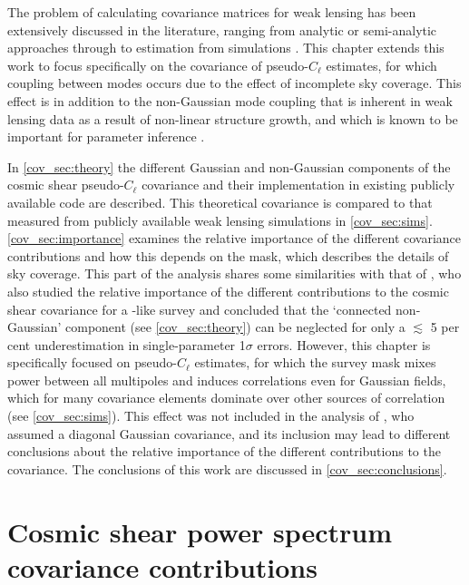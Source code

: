 The problem of calculating covariance matrices for weak lensing has been extensively discussed in the literature, ranging from analytic or semi-analytic approaches \citep{Cooray2001, Schneider2002, Joachimi2008cov, Takada2009, Pielorz2010, Hilbert2011, Barreira2018ssc, Hall2019, GouyouBeauchamps2021} through to estimation from simulations \citep{Sato2011, Harnois-Deraps2015, Sellentin2016, Sellentin2016b, Harnois-Deraps2018, Harnois-Deraps2019, Sgier2019, Schneider2020}. This chapter extends this work to focus specifically on the covariance of pseudo-$C_\ell$ estimates, for which coupling between modes occurs due to the effect of incomplete sky coverage. This effect is in addition to the non-Gaussian mode coupling that is inherent in weak lensing data as a result of non-linear structure growth, and which is known to be important for parameter inference \citep{Sato2013, Barreira2018b}.

In \autoref{cov_sec:theory} the different Gaussian and non-Gaussian components of the cosmic shear pseudo-$C_\ell$ covariance and their implementation in existing publicly available code are described.
This theoretical covariance is compared to that measured from publicly available weak lensing simulations in \autoref{cov_sec:sims}.
\autoref{cov_sec:importance} examines the relative importance of the different covariance contributions and how this depends on the mask, which describes the details of sky coverage.
This part of the analysis shares some similarities with that of \citet{Barreira2018b}, who also studied the relative importance of the different contributions to the cosmic shear covariance for a \Euclid{}-like survey and concluded that the `connected non-Gaussian' component (see \autoref{cov_sec:theory}) can be neglected for only a $\lesssim$ 5 per cent underestimation in single-parameter 1$\sigma$ errors.
However, this chapter is specifically focused on pseudo-$C_\ell$ estimates, for which the survey mask mixes power between all multipoles and induces correlations even for Gaussian fields, which for many covariance elements dominate over other sources of correlation (see \autoref{cov_sec:sims}).
This effect was not included in the analysis of \citet{Barreira2018b}, who assumed a diagonal Gaussian covariance, and its inclusion may lead to different conclusions about the relative importance of the different contributions to the covariance.
The conclusions of this work are discussed in \autoref{cov_sec:conclusions}.

\section{Cosmic shear power spectrum covariance contributions}
\label{cov_sec:theory}

